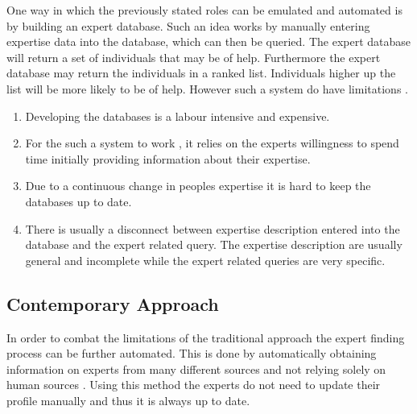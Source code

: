 \documentclass[a4paper,oneside,11pt]{report}
\begin{document}
One way in which the previously stated roles can be emulated and automated is by building an expert database. Such an idea works by manually entering expertise data into the database, which can then be queried. The expert database will return a set of individuals that may be of help. Furthermore the expert database may return the individuals in a ranked list. Individuals higher up the list will be more likely to be of help. However such a system do have limitations \autocite{kobsaseid2003}.
\begin{enumerate}
	\item Developing the databases is a labour intensive and expensive.
	\item For the such a system to work , it relies on the experts willingness to spend time 		  			  initially providing information about their expertise.
	\item Due to a continuous change in peoples expertise it is hard to keep the databases up to 				  date.
	\item There is usually a disconnect between expertise description entered into the database and 	          the expert related query. The expertise description are usually general and incomplete                                                                            		  while the expert related queries are very specific. 
\end{enumerate}

\subsection{Contemporary Approach}
In order to combat the limitations of the traditional approach the expert finding process can be further automated. This is done by automatically obtaining information on experts from many different sources and not relying solely on human sources \autocite{kobsaseid2003}. Using this method the experts do not need to update their profile manually and thus it is always up to date. 
\end{document}
